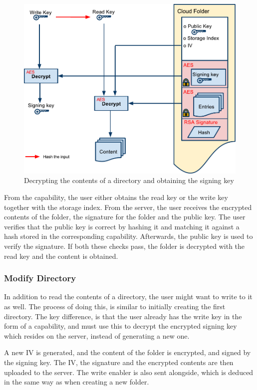 \documentclass[pdftex,english,10pt,b5paper,twoside]{book}
\begin{document}
\begin{figure}[h!]
    \centering
    \includegraphics[width=\columnwidth]{CryptoOpenFolder.pdf}
    \caption{Decrypting the contents of a directory and obtaining the signing
    key}
    \label{fig:CS:OD}
\end{figure}

From the capability, the user either obtains the read key or the write key
together with the storage index. From the server, the user receives the
encrypted contents of the folder, the signature for the folder and the public
key. The user verifies that the public key is correct by hashing it and
matching it against a hash stored in the corresponding capability. Afterwards,
the public key is used to verify the signature. If both these checks pass, the
folder is decrypted with the read key and the content is obtained.

\subsubsection{Modify Directory}

In addition to read the contents of a directory, the user might want to write
to it as well. The process of doing this, is similar to initially creating the
first directory. The key difference, is that the user already has the write key
in the form of a capability, and must use this to decrypt the encrypted signing
key which resides on the server, instead of generating a new one.

A new \ac{IV} is generated, and the content of the folder is encrypted, and
signed by the signing key. The \ac{IV}, the signature and the encrypted
contents are then uploaded to the server. The write enabler is also sent
alongside, which is deduced in the same way as when creating a new folder.
\end{document}
